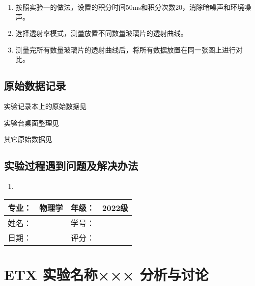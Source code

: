 \documentclass[dvipsnames, svgnames,a4paper,11pt]{article}
\begin{document}
\begin{enumerate}
			\begin{enumerate}
				\item 按照实验一的做法，设置的积分时间50ms和积分次数20，消除暗噪声和环境噪声。
				
				\item 选择透射率模式，测量放置不同数量玻璃片的透射曲线。
				
				\item 测量完所有数量玻璃片的透射曲线后，将所有数据放置在同一张图上进行对比。
				
			\end{enumerate}
	\end{enumerate}
	
	
	\clearpage
	\subsection{原始数据记录}
	实验记录本上的原始数据见%
	
	实验台桌面整理见%
	
	其它原始数据见%
	
	\subsection{实验过程遇到问题及解决办法}
	\begin{enumerate}
		\item 
	\end{enumerate}
	
	
	
	\clearpage
	
	\begin{table}
		\renewcommand\arraystretch{1.7}
		\begin{tabularx}{\textwidth}{|X|X|X|X|}
			\hline
			专业：& 物理学 &年级：& 2022级\\
			\hline
			姓名： &  & 学号：& \\
			\hline
			日期：&  & 评分： &\\
			\hline
		\end{tabularx}
	\end{table}
	
	\section{ETX 实验名称××× \quad\heiti 分析与讨论}
	
\end{document}
